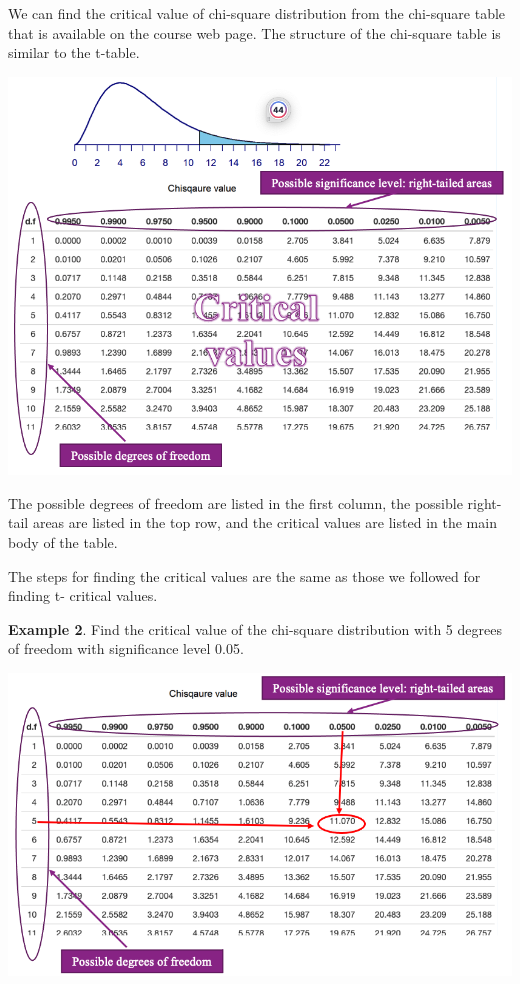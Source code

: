 \documentclass[
]{book}
\begin{document}
We can find the critical value of chi-square distribution from the chi-square table that is available on the course web page. The structure of the chi-square table is similar to the t-table.

\begin{center}\includegraphics[width=0.8\linewidth]{week13/chisqTable} \end{center}

The possible degrees of freedom are listed in the first column, the possible right-tail areas are listed in the top row, and the critical values are listed in the main body of the table.

The steps for finding the critical values are the same as those we followed for finding t- critical values.

\textbf{Example 2}. Find the critical value of the chi-square distribution with 5 degrees of freedom with significance level 0.05.

\begin{center}\includegraphics[width=0.8\linewidth]{week13/example02ChisqCV} \end{center}
\end{document}
